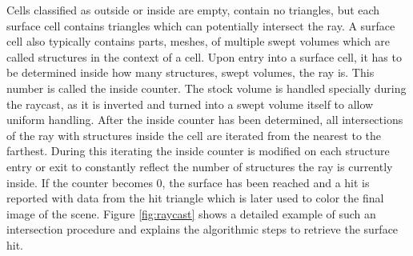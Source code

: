 Cells classified as outside or inside are empty, \ie contain no triangles, but each surface cell contains triangles which can potentially intersect the ray.
A surface cell also typically contains parts, \ie meshes, of multiple swept volumes which are called structures in the context of a cell.
Upon entry into a surface cell, it has to be determined inside how many structures, \ie swept volumes, the ray is.
This number is called the inside counter.
The stock volume is handled specially during the raycast, as it is inverted and turned into a swept volume itself to allow uniform handling.
After the inside counter has been determined, all intersections of the ray with structures inside the cell are iterated from the nearest to the farthest.
During this iterating the inside counter is modified on each structure entry or exit to constantly reflect the number of structures the ray is currently inside.
If the counter becomes 0, the surface has been reached and a hit is reported with data from the hit triangle which is later used to color the final image of the scene.
Figure \ref{fig:raycast} shows a detailed example of such an intersection procedure and explains the algorithmic steps to retrieve the surface hit.

